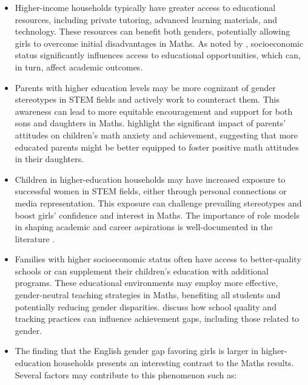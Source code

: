 \documentclass[12pt,a4paper,onecolumn]{article}
\numberwithin{equation}{section}
\begin{document}
\begin{itemize}
    \item Higher-income households typically have greater access to educational resources, including private tutoring, advanced learning materials, and technology. These resources can benefit both genders, potentially allowing girls to overcome initial disadvantages in Maths. As noted by \textcite{baker2002socioeconomic}, socioeconomic status significantly influences access to educational opportunities, which can, in turn, affect academic outcomes.

\item Parents with higher education levels may be more cognizant of gender stereotypes in STEM fields and actively work to counteract them. This awareness can lead to more equitable encouragement and support for both sons and daughters in Maths. \textcite{gunderson2012role} highlight the significant impact of parents' attitudes on children's math anxiety and achievement, suggesting that more educated parents might be better equipped to foster positive math attitudes in their daughters.

\item Children in higher-education households may have increased exposure to successful women in STEM fields, either through personal connections or media representation. This exposure can challenge prevailing stereotypes and boost girls' confidence and interest in Maths. The importance of role models in shaping academic and career aspirations is well-documented in the literature \parencite{bettinger2018role}.

\item Families with higher socioeconomic status often have access to better-quality schools or can supplement their children's education with additional programs. These educational environments may employ more effective, gender-neutral teaching strategies in Maths, benefiting all students and potentially reducing gender disparities. \textcite{chmielewski2013tracking} discuss how school quality and tracking practices can influence achievement gaps, including those related to gender.

\item The finding that the English gender gap favoring girls is larger in higher-education households presents an interesting contrast to the Maths results. Several factors may contribute to this phenomenon such as: 


\end{itemize}
\end{document}
